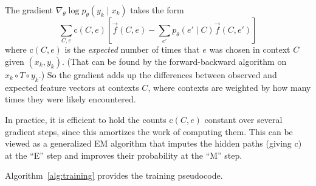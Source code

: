 \documentclass[11pt,letterpaper]{article}
\newcommand{\ptheta}{{p_\theta}}
\begin{document}
The gradient $\nabla_{\theta} \log \ptheta(y_k\mid x_k)$
takes the form
\begin{equation*}
\sum_{C,e} \text{c}(C,e) \left[ \vec{f}(C,e) - \sum_{e'} \ptheta(e'\mid C) \vec{f}(C,e') \right]
\end{equation*}
where $\text{c}(C,e)$ is the {\em expected} number of times that $e$ was chosen in context $C$ given $(x_k,y_k)$.  (That can be found by the forward-backward algorithm on $x_k \circ T \circ y_k$.)  So the gradient adds up the differences between observed and expected feature vectors at contexts $C$, where contexts are weighted by how many times they were likely encountered.


In practice, it is efficient to hold the counts $\text{c}(C,e)$ constant over several gradient steps, since this amortizes the work of computing them.  This can be viewed as a generalized EM algorithm that imputes the hidden paths (giving $\text{c}$) at the ``E'' step 
and improves their probability at the ``M'' step.

Algorithm~\ref{alg:training} provides the training pseudocode.  
\end{document}
